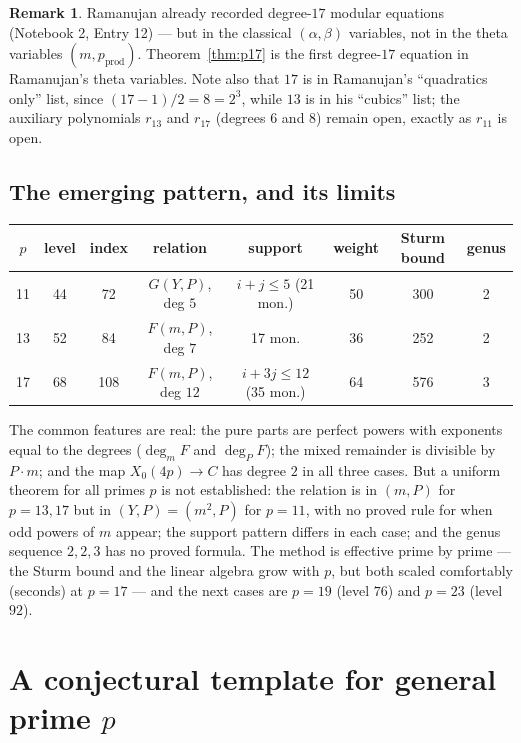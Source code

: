 \documentclass[11pt]{amsart}
\theoremstyle{plain}
\theoremstyle{definition}
\newtheorem{remark}[theorem]{Remark}
\theoremstyle{remark}
\newcommand{\pprod}{p_{\mathrm{prod}}}
\begin{document}
\begin{remark}
Ramanujan already recorded degree-$17$ modular equations (Notebook 2,
Entry 12) --- but in the classical $(\alpha,\beta)$ variables, not in the
theta variables $(m,\pprod)$. Theorem~\ref{thm:p17} is the first degree-$17$
equation in Ramanujan's theta variables. Note also that $17$ is in Ramanujan's
``quadratics only'' list, since $(17-1)/2 = 8 = 2^3$, while $13$ is in his
``cubics'' list; the auxiliary polynomials $r_{13}$ and $r_{17}$ (degrees $6$
and $8$) remain open, exactly as $r_{11}$ is open.
\end{remark}

\subsection{The emerging pattern, and its limits}

\begin{center}
\begin{tabular}{c|c|c|c|c|c|c|c}
$p$ & level & index & relation & support & weight & Sturm bound & genus \\ \hline
11 & 44 & 72 & $G(Y,P)$, deg $5$ & $i+j \leq 5$ (21 mon.) & 50 & 300 & 2 \\
13 & 52 & 84 & $F(m,P)$, deg $7$ & 17 mon. & 36 & 252 & 2 \\
17 & 68 & 108 & $F(m,P)$, deg $12$ & $i+3j \leq 12$ (35 mon.) & 64 & 576 & 3
\end{tabular}
\end{center}

The common features are real: the pure parts are perfect powers with exponents
equal to the degrees ($\deg_m F$ and $\deg_P F$); the mixed remainder is
divisible by $P\cdot m$; and the map $X_0(4p) \to C$ has degree $2$ in all three
cases. But a uniform theorem for all primes $p$ is not established: the relation
is in $(m,P)$ for $p = 13, 17$ but in $(Y,P) = (m^2,P)$ for $p = 11$, with no
proved rule for when odd powers of $m$ appear; the support pattern differs in
each case; and the genus sequence $2, 2, 3$ has no proved formula. The method is
effective prime by prime --- the Sturm bound and the linear algebra grow with
$p$, but both scaled comfortably (seconds) at $p = 17$ --- and the next cases
are $p = 19$ (level $76$) and $p = 23$ (level $92$).

\section{A conjectural template for general prime $p$}
\label{sec:conjecture}
\end{document}
